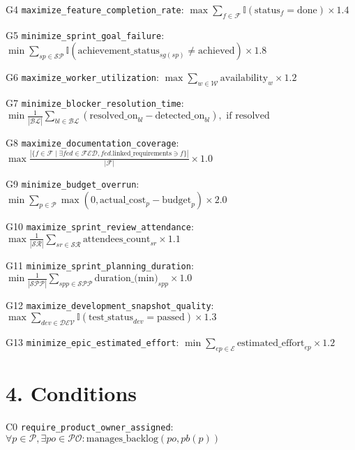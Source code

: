 \documentclass[12pt]{article}
\begin{document}
    \item[G4] \texttt{maximize\_feature\_completion\_rate}: 
    $\max \sum_{f \in \mathcal{F}} \mathbb{I}(\text{status}_f = \text{done}) \times 1.4$
    
    \item[G5] \texttt{minimize\_sprint\_goal\_failure}: 
    $\min \sum_{sp \in \mathcal{SP}} \mathbb{I}(\text{achievement\_status}_{sg(sp)} \neq \text{achieved}) \times 1.8$
    
    \item[G6] \texttt{maximize\_worker\_utilization}: 
    $\max \sum_{w \in \mathcal{W}} \text{availability}_w \times 1.2$
    
    \item[G7] \texttt{minimize\_blocker\_resolution\_time}: 
    $\min \frac{1}{|\mathcal{BL}|} \sum_{bl \in \mathcal{BL}} (\text{resolved\_on}_{bl} - \text{detected\_on}_{bl}), \text{ if resolved}$
    
    \item[G8] \texttt{maximize\_documentation\_coverage}: 
    $\max \frac{|\{f \in \mathcal{F} \mid \exists fed \in \mathcal{FED}, fed.\text{linked\_requirements} \ni f\}|}{|\mathcal{F}|} \times 1.0$
    
    \item[G9] \texttt{minimize\_budget\_overrun}: 
    $\min \sum_{p \in \mathcal{P}} \max(0, \text{actual\_cost}_p - \text{budget}_p) \times 2.0$
    
    \item[G10] \texttt{maximize\_sprint\_review\_attendance}: 
    $\max \frac{1}{|\mathcal{SR}|} \sum_{sr \in \mathcal{SR}} \text{attendees\_count}_{sr} \times 1.1$
    
    \item[G11] \texttt{minimize\_sprint\_planning\_duration}: 
    $\min \frac{1}{|\mathcal{SPP}|} \sum_{spp \in \mathcal{SPP}} \text{duration\_(min)}_{spp} \times 1.0$
    
    \item[G12] \texttt{maximize\_development\_snapshot\_quality}: 
    $\max \sum_{dev \in \mathcal{DEV}} \mathbb{I}(\text{test\_status}_{dev} = \text{passed}) \times 1.3$
    
    \item[G13] \texttt{minimize\_epic\_estimated\_effort}: 
    $\min \sum_{ep \in \mathcal{E}} \text{estimated\_effort}_{ep} \times 1.2$

\section{4. Conditions}
\item[C0] \texttt{require\_product\_owner\_assigned}: 
    $\forall p \in \mathcal{P}, \exists po \in \mathcal{PO}: \text{manages\_backlog}(po, pb(p))$
    
\end{document}
